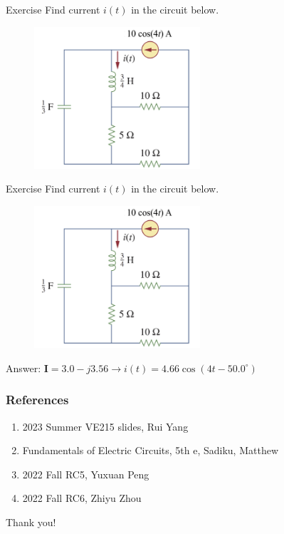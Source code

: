 \documentclass{beamer}
\begin{document}
\begin{frame}{Exercise}
    Find current $i(t)$ in the circuit below.
    \begin{figure}
        \centering
        \includegraphics[width=0.55\textwidth]{img_ch10/exercise.png}
    \end{figure}
\end{frame}


\begin{frame}{Exercise}
    Find current $i(t)$ in the circuit below.
    \begin{figure}
        \centering
        \includegraphics[width=0.55\textwidth]{img_ch10/exercise.png}
    \end{figure}
    
    Answer: $\mathbf{I} = 3.0-j3.56 \rightarrow i(t)=4.66\cos(4t-50.0^{\circ})$
\end{frame}


\begin{frame}
\frametitle{References}
\begin{enumerate}
\item 2023 Summer VE215 slides, Rui Yang
\item Fundamentals of Electric Circuits, 5th e, Sadiku, Matthew
\item 2022 Fall RC5, Yuxuan Peng
\item 2022 Fall RC6, Zhiyu Zhou
\end{enumerate}
\end{frame}


\begin{frame}
\Huge{\centerline{Thank you!}}
\end{frame}
\end{document}
